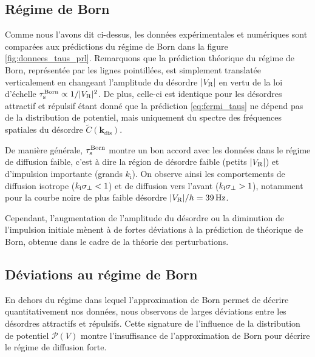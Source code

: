 \subsection{Régime de Born}
Comme nous l'avons dit ci-dessus, les données expérimentales et numériques sont comparées aux prédictions du régime de Born dans la figure \ref{fig:donnees_taus_prl}. Remarquons que la prédiction théorique du régime de Born, représentée par les lignes pointillées, est simplement translatée verticalement en changeant l'amplitude du désordre $|V_{\mathrm{R}}|$ en vertu de la loi d'échelle $\tau_{\mathrm{s}}^{\mathrm{Born}} \propto 1/|V_{\mathrm{R}}|^2$. De plus, celle-ci est identique pour les désordres attractif et répulsif étant donné que la prédiction \ref{eq:fermi_taus} ne dépend pas de la distribution de potentiel, mais uniquement du spectre des fréquences spatiales du désordre $\widetilde{C}(\mathbf{k}_{\mathrm{dis}})$. 

De manière générale, $\tau_{\mathrm{s}}^{\mathrm{Born}}$ montre un bon accord avec les données dans le régime de diffusion faible, c'est à dire la région de désordre faible (petits $|V_{\mathrm{R}}|$) et d'impulsion importante (grands $k_{\mathrm{i}}$). On observe ainsi les comportements de diffusion isotrope ($k_{\mathrm{i}}\sigma_{\perp}<1$) et de diffusion vers l'avant ($k_{\mathrm{i}}\sigma_{\perp}>1$), notamment pour la courbe noire de plus faible désordre $|V_{\mathrm{R}}|/h=\SI{39}{\hertz}$. 

Cependant, l'augmentation de l'amplitude du désordre ou la diminution de l'impulsion initiale mènent à de fortes déviations à la prédiction de théorique de Born, obtenue dans le cadre de la théorie des perturbations. %


\subsection{Déviations au régime de Born}
\label{sc:deviation_regime_born}
En dehors du régime dans lequel l'approximation de Born permet de décrire quantitativement nos données, nous observons de larges déviations entre les désordres attractifs et répulsifs. Cette signature de l'influence de la distribution de potentiel $\mathcal{P}(V)$ montre l'insuffisance de l'approximation de Born pour décrire le régime de diffusion forte.

